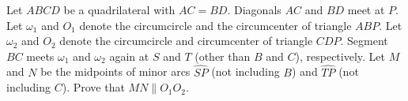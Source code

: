 Let $ABCD$ be a quadrilateral with $AC = BD$.  Diagonals $AC$ and $BD$ meet at $P$.  Let $\omega_1$ and $O_1$ denote the circumcircle and the circumcenter of triangle $ABP$.  Let $\omega_2$ and $O_2$ denote the circumcircle and circumcenter of triangle $CDP$.  Segment $BC$ meets $\omega_1$ and $\omega_2$ again at $S$ and $T$ (other than $B$ and $C$), respectively.  Let $M$ and $N$ be the midpoints of minor arcs $\widehat {SP}$ (not including $B$) and $\widehat {TP}$ (not including $C$).  Prove that $MN \parallel O_1O_2$.